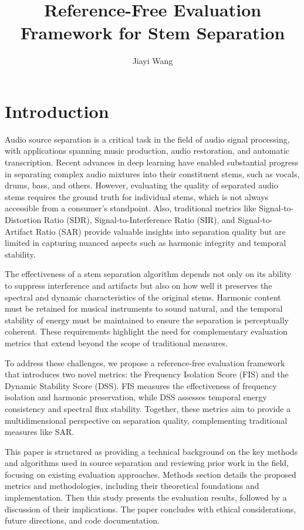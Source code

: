 \documentclass[10pt,twocolumn]{article}
\title{Reference-Free Evaluation Framework for Stem Separation}
\author{Jiayi Wang}
\affiliation{Occidental College}
\begin{document}
\maketitle

\section{Introduction}
Audio source separation is a critical task in the field of audio signal processing, with applications spanning music production, audio restoration, and automatic transcription. Recent advances in deep learning have enabled substantial progress in separating complex audio mixtures into their constituent stems, such as vocals, drums, bass, and others. However, evaluating the quality of separated audio stems requires the ground truth for individual stems, which is not always accessible from a consumer's standpoint. Also, traditional metrics like Signal-to-Distortion Ratio (SDR), Signal-to-Interference Ratio (SIR), and Signal-to-Artifact Ratio (SAR) provide valuable insights into separation quality but are limited in capturing nuanced aspects such as harmonic integrity and temporal stability.

The effectiveness of a stem separation algorithm depends not only on its ability to suppress interference and artifacts but also on how well it preserves the spectral and dynamic characteristics of the original stems. Harmonic content must be retained for musical instruments to sound natural, and the temporal stability of energy must be maintained to ensure the separation is perceptually coherent. These requirements highlight the need for complementary evaluation metrics that extend beyond the scope of traditional measures.

To address these challenges, we propose a reference-free evaluation framework that introduces two novel metrics: the Frequency Isolation Score (FIS) and the Dynamic Stability Score (DSS). FIS measures the effectiveness of frequency isolation and harmonic preservation, while DSS assesses temporal energy consistency and spectral flux stability. Together, these metrics aim to provide a multidimensional perspective on separation quality, complementing traditional measures like SAR.

This paper is structured as providing a technical background on the key methods and algorithms used in source separation and reviewing prior work in the field, focusing on existing evaluation approaches. Methods section details the proposed metrics and methodologies, including their theoretical foundations and implementation. Then this study presents the evaluation results, followed by a discussion of their implications. The paper concludes with ethical considerations, future directions, and code documentation.
\end{document}
